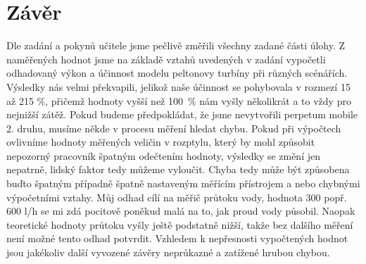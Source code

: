\documentclass{protokol}
\begin{document}
\section{Závěr}
	Dle zadání a pokynů učitele jsme pečlivě změřili všechny zadané části úlohy. Z naměřených hodnot jsme na základě vztahů uvedených v zadání vypočetli odhadovaný výkon a účinnost modelu peltonovy turbíny při různých scénářích. Výsledky nás velmi překvapili, jelikož naše účinnost se pohybovala v rozmezí 15 až 215 \unit{\percent}, přičemž hodnoty vyšší než \SI{100}{\percent} nám vyšly několikrát a to vždy pro nejnižší zátěž. 
	Pokud budeme předpokládat, že jsme nevytvořili perpetum mobile 2. druhu, musíme někde v procesu měření hledat chybu. Pokud při výpočtech ovlivníme hodnoty měřených veličin v rozptylu, který by mohl způsobit nepozorný pracovník špatným odečtením hodnoty, výsledky se změní jen nepatrně, lidský faktor tedy můžeme vyloučit. Chyba tedy může být způsobena buďto špatným případně špatně nastaveným měřícím přístrojem a nebo chybnými výpočetními vztahy. Můj odhad cílí na měřič průtoku vody, hodnota 300 popř. 600 l/h se mi zdá pocitově poněkud malá na to, jak proud vody působil.  Naopak teoretické hodnoty průtoku vyšly ještě podstatně nižší, takže bez dalšího měření není možné tento odhad potvrdit.
	Vzhledem k nepřesnosti vypočtených hodnot jsou jakékoliv další vyvozené závěry neprůkazné a zatížené hrubou chybou.
\end{document}
